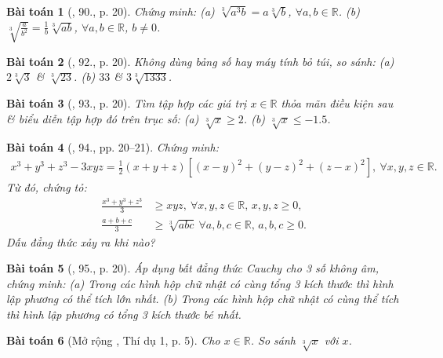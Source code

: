 \documentclass{article}
\newtheorem{baitoan}{Bài toán}
\begin{document}
\begin{baitoan}[\cite{SBT_Toan_9_tap_1}, 90., p. 20]
	Chứng minh: (a) $\sqrt[3]{a^3b} = a\sqrt[3]{b}$, $\forall a,b\in\mathbb{R}$. (b) $\sqrt[3]{\frac{a}{b^2}} = \frac{1}{b}\sqrt[3]{ab}$, $\forall a,b\in\mathbb{R}$, $b\ne0$.
\end{baitoan}

\begin{baitoan}[\cite{SBT_Toan_9_tap_1}, 92., p. 20]
	Không dùng bảng số hay máy tính bỏ túi, so sánh: (a) $2\sqrt[3]{3}$ \& $\sqrt[3]{23}$. (b) $33$ \& $3\sqrt[3]{1333}$.
\end{baitoan}

\begin{baitoan}[\cite{SBT_Toan_9_tap_1}, 93., p. 20]
	Tìm tập hợp các giá trị $x\in\mathbb{R}$ thỏa mãn điều kiện sau \& biểu diễn tập hợp đó trên trục số: (a) $\sqrt[3]{x}\ge2$. (b) $\sqrt[3]{x}\le-1.5$.
\end{baitoan}

\begin{baitoan}[\cite{SBT_Toan_9_tap_1}, 94., pp. 20--21]
	Chứng minh:
	\begin{align*}
		x^3 + y^3 + z^3 - 3xyz = \frac{1}{2}(x + y + z)\left[(x - y)^2 + (y - z)^2 + (z - x)^2\right],\ \forall x,y,z\in\mathbb{R}.
	\end{align*}
	Từ đó, chứng tỏ:
	\begin{align*}
		\frac{x^3 + y^3 + z^3}{3}&\ge xyz,\ \forall x,y,z\in\mathbb{R},\,x,y,z\ge0,\\
		\frac{a + b + c}{3}&\ge\sqrt[3]{abc}\ \forall a,b,c\in\mathbb{R},\,a,b,c\ge0.
	\end{align*}
	Dấu đẳng thức xảy ra khi nào?
\end{baitoan}

\begin{baitoan}[\cite{SBT_Toan_9_tap_1}, 95., p. 20]
	Áp dụng bất đẳng thức Cauchy cho 3 số không âm, chứng minh: (a) Trong các hình hộp chữ nhật có cùng tổng 3 kích thước thì hình lập phương có thể tích lớn nhất. (b) Trong các hình hộp chữ nhật có cùng thể tích thì hình lập phương có tổng 3 kích thước bé nhất.
\end{baitoan}

\begin{baitoan}[Mở rộng \cite{Tuyen_Toan_9}, Thí dụ 1, p. 5]
	Cho $x\in\mathbb{R}$. So sánh $\sqrt[3]{x}$ với $x$.
\end{baitoan}
\end{document}
